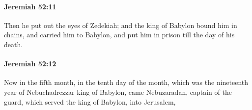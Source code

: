 		\paragraph{Jeremiah 52:11} %
			\label{JEREMIAH-52-11}

			Then he put out the eyes of Zedekiah; and the king of Babylon bound him in chains, and carried him to Babylon, and put him in prison till the day of his death.


		\paragraph{Jeremiah 52:12} %
			\label{JEREMIAH-52-12}

			Now in the fifth month, in the tenth day of the month, which was the nineteenth year of Nebuchadrezzar king of Babylon, came Nebuzaradan, captain of the guard, which served the king of Babylon, into Jerusalem,

